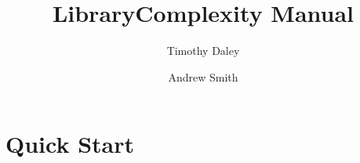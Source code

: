 \documentclass[11pt]{report}
\title{LibraryComplexity Manual}
\author{Timothy Daley \and Andrew Smith}
\begin{document}
\maketitle

\chapter{Quick Start}
\end{document}
